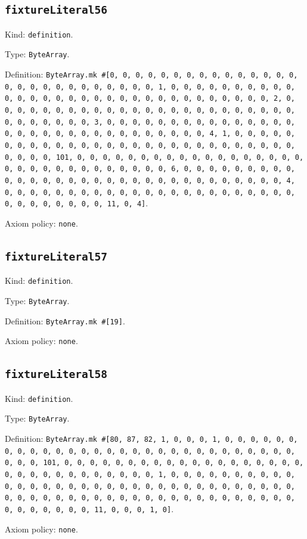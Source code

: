 \documentclass[11pt]{article}
\begin{document}
\subsection*{\texttt{fixtureLiteral56}}
\noindent Kind: \texttt{definition}.\par
\noindent Type: \texttt{ByteArray}.\par
\noindent Definition: \texttt{ByteArray.mk \#[0, 0, 0, 0, 0, 0, 0, 0, 0, 0, 0, 0, 0, 0, 0, 0, 0, 0, 0, 0, 0, 0, 0, 0, 0, 0, 0, 1, 0, 0, 0, 0, 0, 0, 0, 0, 0, 0, 0, 0, 0, 0, 0, 0, 0, 0, 0, 0, 0, 0, 0, 0, 0, 0, 0, 0, 0, 0, 0, 2, 0, 0, 0, 0, 0, 0, 0, 0, 0, 0, 0, 0, 0, 0, 0, 0, 0, 0, 0, 0, 0, 0, 0, 0, 0, 0, 0, 0, 0, 0, 0, 3, 0, 0, 0, 0, 0, 0, 0, 0, 0, 0, 0, 0, 0, 0, 0, 0, 0, 0, 0, 0, 0, 0, 0, 0, 0, 0, 0, 0, 0, 0, 0, 4, 1, 0, 0, 0, 0, 0, 0, 0, 0, 0, 0, 0, 0, 0, 0, 0, 0, 0, 0, 0, 0, 0, 0, 0, 0, 0, 0, 0, 0, 0, 0, 0, 0, 101, 0, 0, 0, 0, 0, 0, 0, 0, 0, 0, 0, 0, 0, 0, 0, 0, 0, 0, 0, 0, 0, 0, 0, 0, 0, 0, 0, 0, 0, 0, 0, 6, 0, 0, 0, 0, 0, 0, 0, 0, 0, 0, 0, 0, 0, 0, 0, 0, 0, 0, 0, 0, 0, 0, 0, 0, 0, 0, 0, 0, 0, 0, 0, 4, 0, 0, 0, 0, 0, 0, 0, 0, 0, 0, 0, 0, 0, 0, 0, 0, 0, 0, 0, 0, 0, 0, 0, 0, 0, 0, 0, 0, 0, 0, 0, 11, 0, 4]}.\par
\noindent Axiom policy: \texttt{none}.\par
\subsection*{\texttt{fixtureLiteral57}}
\noindent Kind: \texttt{definition}.\par
\noindent Type: \texttt{ByteArray}.\par
\noindent Definition: \texttt{ByteArray.mk \#[19]}.\par
\noindent Axiom policy: \texttt{none}.\par
\subsection*{\texttt{fixtureLiteral58}}
\noindent Kind: \texttt{definition}.\par
\noindent Type: \texttt{ByteArray}.\par
\noindent Definition: \texttt{ByteArray.mk \#[80, 87, 82, 1, 0, 0, 0, 1, 0, 0, 0, 0, 0, 0, 0, 0, 0, 0, 0, 0, 0, 0, 0, 0, 0, 0, 0, 0, 0, 0, 0, 0, 0, 0, 0, 0, 0, 0, 0, 0, 101, 0, 0, 0, 0, 0, 0, 0, 0, 0, 0, 0, 0, 0, 0, 0, 0, 0, 0, 0, 0, 0, 0, 0, 0, 0, 0, 0, 0, 0, 0, 0, 1, 0, 0, 0, 0, 0, 0, 0, 0, 0, 0, 0, 0, 0, 0, 0, 0, 0, 0, 0, 0, 0, 0, 0, 0, 0, 0, 0, 0, 0, 0, 0, 0, 0, 0, 0, 0, 0, 0, 0, 0, 0, 0, 0, 0, 0, 0, 0, 0, 0, 0, 0, 0, 0, 0, 0, 0, 0, 0, 0, 0, 0, 0, 0, 11, 0, 0, 0, 1, 0]}.\par
\noindent Axiom policy: \texttt{none}.\par
\end{document}

